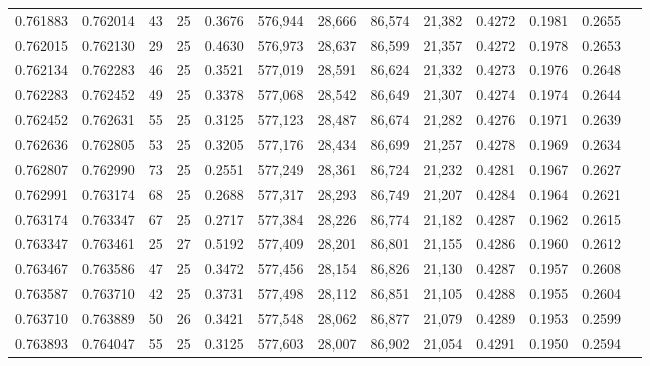 \begin{tabular}{rrrrrrrrrrrrr}
0.761883 & 0.762014 &    43 &  25 &                                     0.3676 & 576,944 &  28,666 &  86,574 &  21,382 & 0.4272 & 0.1981 & 0.2655 \\
0.762015 & 0.762130 &    29 &  25 &                                     0.4630 & 576,973 &  28,637 &  86,599 &  21,357 & 0.4272 & 0.1978 & 0.2653 \\
0.762134 & 0.762283 &    46 &  25 &                                     0.3521 & 577,019 &  28,591 &  86,624 &  21,332 & 0.4273 & 0.1976 & 0.2648 \\
0.762283 & 0.762452 &    49 &  25 &                                     0.3378 & 577,068 &  28,542 &  86,649 &  21,307 & 0.4274 & 0.1974 & 0.2644 \\
0.762452 & 0.762631 &    55 &  25 &                                     0.3125 & 577,123 &  28,487 &  86,674 &  21,282 & 0.4276 & 0.1971 & 0.2639 \\
0.762636 & 0.762805 &    53 &  25 &                                     0.3205 & 577,176 &  28,434 &  86,699 &  21,257 & 0.4278 & 0.1969 & 0.2634 \\
0.762807 & 0.762990 &    73 &  25 &                                     0.2551 & 577,249 &  28,361 &  86,724 &  21,232 & 0.4281 & 0.1967 & 0.2627 \\
0.762991 & 0.763174 &    68 &  25 &                                     0.2688 & 577,317 &  28,293 &  86,749 &  21,207 & 0.4284 & 0.1964 & 0.2621 \\
0.763174 & 0.763347 &    67 &  25 &                                     0.2717 & 577,384 &  28,226 &  86,774 &  21,182 & 0.4287 & 0.1962 & 0.2615 \\
0.763347 & 0.763461 &    25 &  27 &                                     0.5192 & 577,409 &  28,201 &  86,801 &  21,155 & 0.4286 & 0.1960 & 0.2612 \\
0.763467 & 0.763586 &    47 &  25 &                                     0.3472 & 577,456 &  28,154 &  86,826 &  21,130 & 0.4287 & 0.1957 & 0.2608 \\
0.763587 & 0.763710 &    42 &  25 &                                     0.3731 & 577,498 &  28,112 &  86,851 &  21,105 & 0.4288 & 0.1955 & 0.2604 \\
0.763710 & 0.763889 &    50 &  26 &                                     0.3421 & 577,548 &  28,062 &  86,877 &  21,079 & 0.4289 & 0.1953 & 0.2599 \\
0.763893 & 0.764047 &    55 &  25 &                                     0.3125 & 577,603 &  28,007 &  86,902 &  21,054 & 0.4291 & 0.1950 & 0.2594 \\

\end{tabular}

